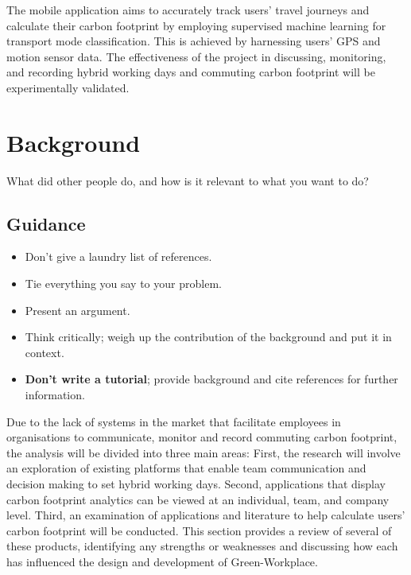 \documentclass{l4proj}
\begin{document}
The mobile application aims to accurately track users' travel journeys and calculate their carbon footprint by employing supervised machine learning for transport mode classification. This is achieved by harnessing users' GPS and motion sensor data. The effectiveness of the project in discussing, monitoring, and recording hybrid working days and commuting carbon footprint will be experimentally validated.



\chapter{Background}


What did other people do, and how is it relevant to what you want to do?
\section{Guidance}
\begin{itemize}    
    \item
      Don't give a laundry list of references.
    \item
      Tie everything you say to your problem.
    \item
      Present an argument.
    \item Think critically; weigh up the contribution of the background and put it in context.    
    \item
      \textbf{Don't write a tutorial}; provide background and cite
      references for further information.
\end{itemize}


Due to the lack of systems in the market that facilitate employees in organisations to communicate, monitor and record commuting carbon footprint, the analysis will be divided into three main areas: First, the research will involve an exploration of existing platforms that enable team communication and decision making to set hybrid working days. Second, applications that display carbon footprint analytics can be viewed at an individual, team, and company level. Third, an examination of applications and literature to help calculate users’ carbon footprint will be conducted. This section provides a review of several of these products, identifying any strengths or weaknesses and discussing how each has influenced the design and development of Green-Workplace.
\end{document}
